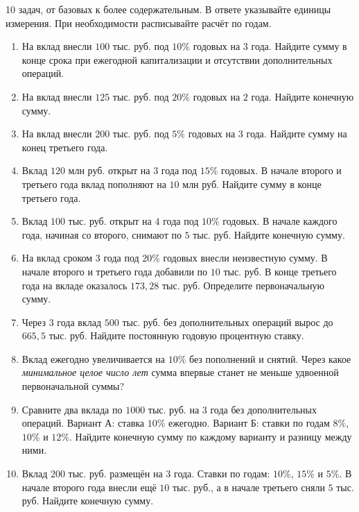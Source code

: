 \documentclass[a4paper,12pt]{article}
\newcommand{\major}[1]{\Needspace{7\baselineskip}\vspace{5mm}\noindent{\large\bfseries\color{darkaccent}#1}\par\vspace{1mm}}
\begin{document}
\clearpage
\major{Тренировочный блок --- Путь А}
{\color{textgray}10 задач, от базовых к более содержательным. В ответе указывайте единицы измерения. При необходимости расписывайте расчёт по годам.}
\vspace{3mm}
\begin{enumerate}[label=\textbf{\arabic*.},itemsep=9pt]
\item На вклад внесли $100$ тыс. руб. под $10\%$ годовых на $3$ года. Найдите сумму в конце срока при ежегодной капитализации и отсутствии дополнительных операций.
\item На вклад внесли $125$ тыс. руб. под $20\%$ годовых на $2$ года. Найдите конечную сумму.
\item На вклад внесли $200$ тыс. руб. под $5\%$ годовых на $3$ года. Найдите сумму на конец третьего года.
\item Вклад $120$ млн руб. открыт на $3$ года под $15\%$ годовых. В начале второго и третьего года вклад пополняют на $10$ млн руб. Найдите сумму в конце третьего года.
\item Вклад $100$ тыс. руб. открыт на $4$ года под $10\%$ годовых. В начале каждого года, начиная со второго, снимают по $5$ тыс. руб. Найдите конечную сумму.
\item На вклад сроком $3$ года под $20\%$ годовых внесли неизвестную сумму. В начале второго и третьего года добавили по $10$ тыс. руб. В конце третьего года на вкладе оказалось $173{,}28$ тыс. руб. Определите первоначальную сумму.
\item Через $3$ года вклад $500$ тыс. руб. без дополнительных операций вырос до $665{,}5$ тыс. руб. Найдите постоянную годовую процентную ставку.
\item Вклад ежегодно увеличивается на $10\%$ без пополнений и снятий. Через какое \emph{минимальное целое число лет} сумма впервые станет не меньше удвоенной первоначальной суммы?
\item Сравните два вклада по $1000$ тыс. руб. на $3$ года без дополнительных операций. Вариант А: ставка $10\%$ ежегодно. Вариант Б: ставки по годам $8\%$, $10\%$ и $12\%$. Найдите конечную сумму по каждому варианту и разницу между ними.
\item Вклад $200$ тыс. руб. размещён на $3$ года. Ставки по годам: $10\%$, $15\%$ и $5\%$. В начале второго года внесли ещё $10$ тыс. руб., а в начале третьего сняли $5$ тыс. руб. Найдите конечную сумму.
\end{enumerate}
\end{document}
